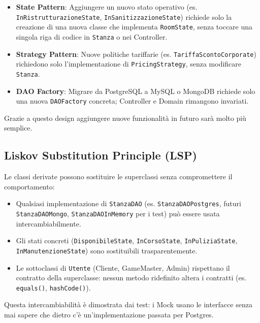\begin{itemize}
    \item \textbf{State Pattern}: Aggiungere un nuovo stato operativo (es. \texttt{InRistrutturazioneState}, \texttt{InSanitizzazioneState}) richiede solo la creazione di una nuova classe che implementa \texttt{RoomState}, senza toccare una singola riga di codice in \texttt{Stanza} o nei Controller.
    \item \textbf{Strategy Pattern}: Nuove politiche tariffarie (es. \texttt{Tariffa\allowbreak Sconto\allowbreak Corporate}) richiedono solo l'implementazione di \texttt{PricingStrategy}, senza modificare \texttt{Stanza}.
    \item \textbf{DAO Factory}: Migrare da PostgreSQL a MySQL o MongoDB richiede solo una nuova \texttt{DAOFactory} concreta; Controller e Domain rimangono invariati.
\end{itemize}

Grazie a questo design aggiungere nuove funzionalità in futuro sarà molto più semplice.

\subsection{Liskov Substitution Principle (LSP)}
Le classi derivate possono sostituire le superclassi senza compromettere il comportamento:

\begin{itemize}
    \item Qualsiasi implementazione di \texttt{StanzaDAO} (es. \texttt{Stanza\allowbreak DAO\allowbreak Postgres}, futuri \texttt{Stanza\allowbreak DAO\allowbreak Mongo}, \texttt{Stanza\allowbreak DAO\allowbreak InMemory} per i test) può essere usata intercambiabilmente.
    \item Gli stati concreti (\texttt{DisponibileState}, \texttt{InCorsoState}, \texttt{In\allowbreak Pulizia\allowbreak State}, \texttt{In\allowbreak Manuten\allowbreak zione\allowbreak State}) sono sostituibili trasparentemente.
    \item Le sottoclassi di \texttt{Utente} (Cliente, GameMaster, Admin) rispettano il contratto della superclasse: nessun metodo ridefinito altera i contratti (es. \texttt{equals()}, \texttt{hashCode()}).
\end{itemize}

Questa intercambiabilità è dimostrata dai test: i Mock usano le interfacce senza mai sapere che dietro c'è un'implementazione passata per Postgres.

